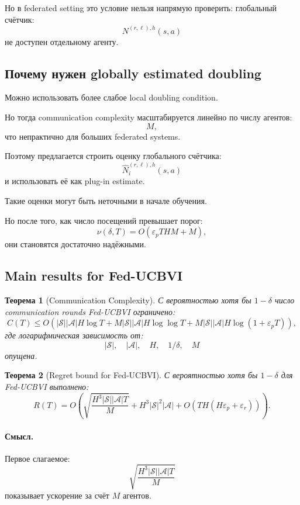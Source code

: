 \documentclass[12pt,a4paper]{article}
\newtheorem{theorem}{Теорема}
\begin{document}
Но в federated setting это условие нельзя напрямую проверить: глобальный счётчик:
\[
N^{(r,\ell),h}(s,a)
\]
не доступен отдельному агенту.

\subsection{Почему нужен globally estimated doubling}

Можно использовать более слабое local doubling condition.

Но тогда communication complexity масштабируется линейно по числу агентов:
\[
M,
\]
что непрактично для больших federated systems.

Поэтому предлагается строить оценку глобального счётчика:
\[
\widehat N_i^{(r,\ell),h}(s,a)
\]
и использовать её как plug-in estimate.

Такие оценки могут быть неточными в начале обучения.

Но после того, как число посещений превышает порог:
\[
\nu(\delta,T)
=
O(\varepsilon_pTHM+M),
\]
они становятся достаточно надёжными.

\subsection{Main results for Fed-UCBVI}

\begin{theorem}[Communication Complexity]
С вероятностью хотя бы $1-\delta$ число communication rounds Fed-UCBVI ограничено:
\[
C(T)
\le
O
\left(
|\mathcal S||\mathcal A|H\log T
+
M|\mathcal S||\mathcal A|H\log\log T
+
M|\mathcal S||\mathcal A|H
\log(1+\varepsilon_pT)
\right),
\]
где логарифмическая зависимость от:
\[
|\mathcal S|,
\quad
|\mathcal A|,
\quad
H,
\quad
1/\delta,
\quad
M
\]
опущена.
\end{theorem}

\begin{theorem}[Regret bound for Fed-UCBVI]
С вероятностью хотя бы $1-\delta$ для Fed-UCBVI выполнено:
\[
R(T)
=
O
\left(
\sqrt{
\frac{
H^3|\mathcal S||\mathcal A|T
}{M}
}
+
H^3|\mathcal S|^2|\mathcal A|
+
O
\left(
TH(H\varepsilon_p+\varepsilon_r)
\right)
\right).
\]
\end{theorem}

\paragraph{Смысл.}

Первое слагаемое:
\[
\sqrt{
\frac{
H^3|\mathcal S||\mathcal A|T
}{M}
}
\]
показывает ускорение за счёт $M$ агентов.
\end{document}
